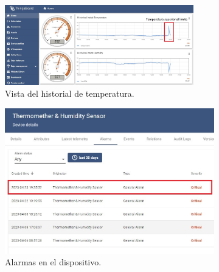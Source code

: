\begin{figure}[!h]
     \centering
       \begin{subfigure}[b]{0.8\textwidth}
	    \centering
		 \includegraphics[width=0.9\textwidth]{./Figures/chapter4/temperature.jpg}
		\caption{Vista del historial de temperatura.}
		\label{fig:temp_graph}
     \end{subfigure}
          \hfill
     \begin{subfigure}[b]{0.50\textwidth}
		\centering
		\includegraphics[width=1\textwidth]{./Figures/chapter4/temp_alarm.jpg}
		\caption{Alarmas en el dispositivo.}
		\label{fig:temp_alarm}
     \end{subfigure}
     \begin{subfigure}[b]{0.45\textwidth}
		\centering

\end{subfigure}
\end{figure}
